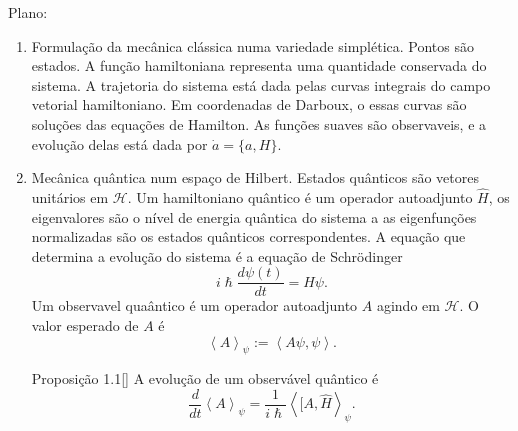 Plano:
\begin{enumerate}
\item Formulação da mecânica clássica numa variedade simplética. Pontos são estados. A função hamiltoniana representa uma quantidade conservada do sistema. A trajetoria do sistema está dada pelas curvas integrais do campo vetorial hamiltoniano. Em coordenadas de Darboux, o essas curvas são soluções das equações de Hamilton. As funções suaves são observaveis, e a evolução delas está dada por $\dot a =\{a, H\}$.

\item Mecânica quântica num espaço de Hilbert. Estados quânticos são vetores unitários em $\mathcal{H}$. Um hamiltoniano quântico é um operador autoadjunto $\hat{H}$, os eigenvalores são o nível de energia quântica do sistema a as eigenfunções normalizadas são os estados quânticos correspondentes. A equação que determina a evolução do sistema é a equação de Schrödinger
	\[i \hslash \frac{d\psi(t)}{dt}=\hat{H}\psi.\]
Um observavel quaântico é um operador autoadjunto $A$ agindo em $\mathcal{H}$. O valor esperado de $A$ é
\[\left<A\right>_\psi:=\left<A\psi,\psi\right>.\]
\begin{thing3}{Proposição 1.1}[\cite{wang}]\leavevmode
A evolução de um observável quântico é
\[\frac{d}{dt}\left<A\right>_{\psi}=\frac{1}{i\hslash}\left<[A,\hat{H}\right>_\psi.\]
\end{thing3}


\end{enumerate}
